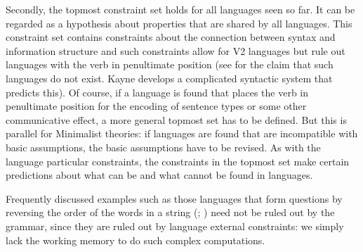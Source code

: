 Secondly, the topmost constraint set holds for all languages seen so far. It can be regarded as a
hypothesis about properties that are shared by all languages. This constraint set contains
constraints about the connection between syntax and information structure and such constraints allow
for V2 languages but rule out languages with the verb in penultimate position (see \citealp[]{Kayne94a-u} for the claim that such languages do not exist. Kayne develops a complicated
syntactic system that predicts this). Of course, if a language is found that places the verb in penultimate
position for the encoding of sentence types or some other communicative effect, a more
general topmost set has to be defined. But this is parallel for Minimalist theories: if languages
are found that are incompatible with basic assumptions, the basic assumptions have to be revised. As
with the language particular constraints, the constraints in the topmost set make certain
predictions about what can be and what cannot be found in languages.

Frequently discussed examples such as those languages that form questions by reversing the order of
the words in a string (\citealp[]{Haider2015a-u}; \citealp{MMGRRBW2003a}) need not be ruled out by the grammar, since they are ruled out by
language external constraints: we simply lack the working memory to do such complex
computations.


